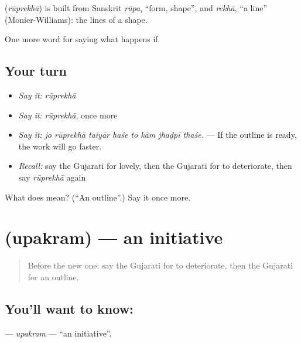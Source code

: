\begin{cousinweb}
\textbf{} (\emph{rūprekhā}) is built from Sanskrit \emph{rūpa}, \textquotedblleft{}form, shape\textquotedblright{}, and \emph{rekhā}, \textquotedblleft{}a line\textquotedblright{} (Monier-Williams): the lines of a shape.
\end{cousinweb}

\begin{grammarlens}[title={What you've built}]
One more word for saying what happens if.
\end{grammarlens}

\subsection*{Your turn}
\begin{itemize}
\raggedright
  \item \emph{Say it:} \emph{rūprekhā}
  \item \emph{Say it:} \emph{rūprekhā}, once more
  \item \emph{Say it:} \emph{jo rūprekhā taiyār haśe to kām jhaḍpī thaśe.} — If the outline is ready, the work will go faster.
  \item \emph{Recall:} say the Gujarati for lovely, then the Gujarati for to deteriorate, then say \emph{rūprekhā} again
\end{itemize}

\begin{tcolorbox}[breakable,colback=teal!4,colframe=teal!35!black,title={Before you move on}]
What does  mean? (\textquotedblleft{}An outline\textquotedblright{}.) Say it once more.
\end{tcolorbox}
\section[\texorpdfstring{\gu{ઉપક્રમ} (upakram)}{ઉપક્રમ (upakram)}]{ (upakram) — an initiative}

\label{lesson:GU-C388-upakram}



\begin{quote}
Before the new one: say the Gujarati for to deteriorate, then the Gujarati for an outline.
\end{quote}

\subsection*{You'll want to know: }
\textbf{} — \emph{upakram} — \textquotedblleft{}an initiative\textquotedblright{}.

